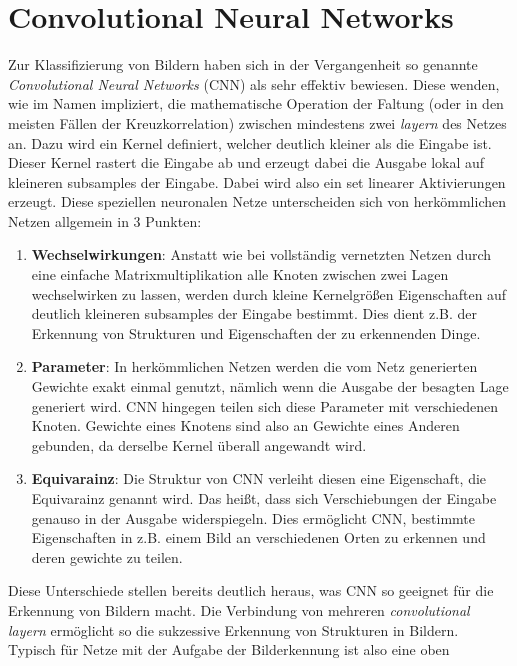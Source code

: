 \chapter{Convolutional Neural Networks}\label{sec:netze}

Zur Klassifizierung von Bildern haben sich in der Vergangenheit so genannte
\textit{Convolutional Neural Networks} (CNN) als sehr effektiv bewiesen.
Diese wenden, wie im Namen impliziert, die mathematische Operation der Faltung
(oder in den meisten Fällen der Kreuzkorrelation) zwischen mindestens zwei
\textit{layern} des Netzes an.
Dazu wird ein Kernel definiert, welcher deutlich kleiner als die Eingabe ist.
Dieser Kernel rastert die Eingabe ab und erzeugt dabei die Ausgabe lokal auf
kleineren subsamples der Eingabe. Dabei wird also ein set linearer Aktivierungen
erzeugt.
Diese speziellen neuronalen Netze unterscheiden sich von herkömmlichen Netzen
allgemein in 3 Punkten:
%
\begin{enumerate}
  \item \textbf{Wechselwirkungen}: Anstatt wie bei vollständig vernetzten
  Netzen durch eine einfache Matrixmultiplikation alle Knoten zwischen zwei
  Lagen wechselwirken zu lassen, werden durch kleine Kernelgrößen
  Eigenschaften auf deutlich kleineren subsamples der Eingabe bestimmt. Dies dient
  z.B. der Erkennung von Strukturen und Eigenschaften der zu erkennenden Dinge.
  \item \textbf{Parameter}: In herkömmlichen Netzen werden die vom Netz
  generierten Gewichte exakt einmal genutzt, nämlich wenn die Ausgabe der
  besagten Lage generiert wird. CNN hingegen teilen sich diese Parameter mit
  verschiedenen Knoten. Gewichte eines Knotens sind also an Gewichte eines
  Anderen gebunden, da derselbe Kernel überall angewandt wird.
  \item \textbf{Equivarainz}: Die Struktur von CNN verleiht diesen eine
  Eigenschaft, die Equivarainz genannt wird. Das heißt, dass sich
  Verschiebungen der Eingabe genauso in der Ausgabe widerspiegeln. Dies ermöglicht
  CNN, bestimmte Eigenschaften in z.B. einem Bild an verschiedenen Orten zu erkennen
  und deren gewichte zu teilen.
\end{enumerate}
%
Diese Unterschiede stellen bereits deutlich heraus, was CNN so geeignet für die
Erkennung von Bildern macht. Die Verbindung von mehreren \textit{convolutional
layern} ermöglicht so die sukzessive Erkennung von Strukturen in Bildern. \\
Typisch für Netze mit der Aufgabe der Bilderkennung ist also eine oben

